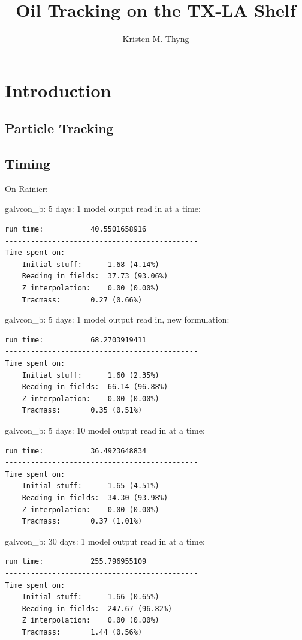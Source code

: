 \documentclass[11pt]{article}
\title{Oil Tracking on the TX-LA Shelf}
\author{Kristen M. Thyng}
\begin{document}
\maketitle

\section{Introduction}

\subsection{Particle Tracking}

\subsection{Timing}

On Rainier:

galvcon_b: 5 days: 1 model output read in at a time: \\
\begin{verbatim}
run time:           40.5501658916
---------------------------------------------
Time spent on:
    Initial stuff:      1.68 (4.14%)
    Reading in fields:  37.73 (93.06%)
    Z interpolation:    0.00 (0.00%)
    Tracmass:       0.27 (0.66%)
\end{verbatim}

galvcon_b: 5 days: 1 model output read in, new formulation: \\
\begin{verbatim}
run time:           68.2703919411
---------------------------------------------
Time spent on:
    Initial stuff:      1.60 (2.35%)
    Reading in fields:  66.14 (96.88%)
    Z interpolation:    0.00 (0.00%)
    Tracmass:       0.35 (0.51%)
\end{verbatim}

galvcon_b: 5 days: 10 model output read in at a time: \\
\begin{verbatim}
run time:           36.4923648834
---------------------------------------------
Time spent on:
    Initial stuff:      1.65 (4.51%)
    Reading in fields:  34.30 (93.98%)
    Z interpolation:    0.00 (0.00%)
    Tracmass:       0.37 (1.01%)
\end{verbatim}

galvcon_b: 30 days: 1 model output read in at a time: \\
\begin{verbatim}
run time:           255.796955109
---------------------------------------------
Time spent on:
    Initial stuff:      1.66 (0.65%)
    Reading in fields:  247.67 (96.82%)
    Z interpolation:    0.00 (0.00%)
    Tracmass:       1.44 (0.56%)
\end{verbatim}
\end{document}
